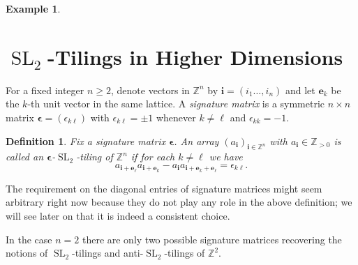 \documentclass[12pt]{amsart}
\newtheorem{definition}[theorem]{Definition}
\newtheorem{example}[theorem]{Example}
\newcommand{\bepsilon}{\boldsymbol{\epsilon}}
\newcommand{\be}{\boldsymbol{e}}
\newcommand{\bi}{\boldsymbol{i}}
\newcommand{\SL}{\operatorname{SL}}
\newcommand{\ZZ}{\mathbb{Z}}
\begin{document}
\begin{example}
\begin{center}
      \end{center}
    \end{example}

\section{$\SL_2$-Tilings in Higher Dimensions}
  For a fixed integer $n\geq 2$, denote vectors in $\ZZ^n$ by $\bi=(i_1\dots,i_n)$ and let $\be_k$ be the $k$-th unit vector in the same lattice.
  A \emph{signature matrix} is a symmetric $n\times n$ matrix $\bepsilon=(\epsilon_{k\ell})$ with $\epsilon_{k\ell}=\pm 1$ whenever $k\neq \ell$ and $\epsilon_{kk}=-1$.
  \begin{definition}
    Fix a signature matrix $\bepsilon$.
    An array $(a_{\bi})_{\bi\in\ZZ^n}$ with $a_{\bi}\in\ZZ_{>0}$ is called an \emph{$\bepsilon$-$\SL_2$-tiling of $\ZZ^n$} if for each $k \neq\ell$ we have
    \begin{equation}\label{eq:higher sl2 recursion}
      a_{\bi+\be_\ell}a_{\bi+\be_k}-a_{\bi}a_{\bi+\be_k+\be_\ell}=\epsilon_{k\ell}.
    \end{equation}
  \end{definition}
  The requirement on the diagonal entries of signature matrices might seem arbitrary right now because they do not play any role in the above definition; we will see later on that it is indeed a consistent choice.

  In the case $n=2$ there are only two possible signature matrices recovering the notions of $\SL_2$-tilings and anti-$\SL_2$-tilings of $\ZZ^2$.
\end{document}
